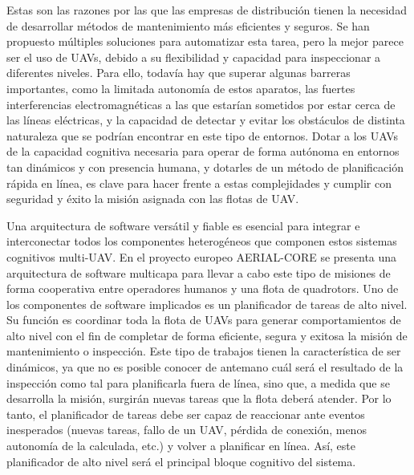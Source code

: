 \documentclass[fontsize=11pt, English=false, Español=true, Myfinal=true, twoside, numbers=noenddot]{scrbook}
\begin{document}
Estas son las razones por las que las empresas de distribución tienen la necesidad de desarrollar métodos de mantenimiento más eficientes y seguros. Se han propuesto múltiples soluciones para automatizar esta tarea, pero la mejor parece ser el uso de \glspl{UAV}, debido a su flexibilidad y capacidad para inspeccionar a diferentes niveles. Para ello, todavía hay que superar algunas barreras importantes, como la limitada autonomía de estos aparatos, las fuertes interferencias electromagnéticas a las que estarían sometidos por estar cerca de las líneas eléctricas, y la capacidad de detectar y evitar los obstáculos de distinta naturaleza que se podrían encontrar en este tipo de entornos. Dotar a los \glspl{UAV} de la capacidad cognitiva necesaria para operar de forma autónoma en entornos tan dinámicos y con presencia humana, y dotarles de un método de planificación rápida en línea, es clave para hacer frente a estas complejidades y cumplir con seguridad y éxito la misión asignada con las flotas de \gls{UAV}.

Una arquitectura de software versátil y fiable es esencial para integrar e interconectar todos los componentes heterogéneos que componen estos sistemas cognitivos multi-\gls{UAV}. En el proyecto europeo AERIAL-CORE se presenta una arquitectura de software multicapa para llevar a cabo este tipo de misiones de forma cooperativa entre operadores humanos y una flota de quadrotors. Uno de los componentes de software implicados es un planificador de tareas de alto nivel. Su función es coordinar toda la flota de \glspl{UAV} para generar comportamientos de alto nivel con el fin de completar de forma eficiente, segura y exitosa la misión de mantenimiento o inspección. Este tipo de trabajos tienen la característica de ser dinámicos, ya que no es posible conocer de antemano cuál será el resultado de la inspección como tal para planificarla fuera de línea, sino que, a medida que se desarrolla la misión, surgirán nuevas tareas que la flota deberá atender. Por lo tanto, el planificador de tareas debe ser capaz de reaccionar ante eventos inesperados (nuevas tareas, fallo de un \gls{UAV}, pérdida de conexión, menos autonomía de la calculada, etc.) y volver a planificar en línea. Así, este planificador de alto nivel será el principal bloque cognitivo del sistema.
\end{document}
